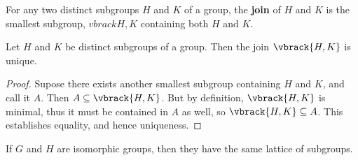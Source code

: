 \begin{definition}
    For any two distinct subgroups $H$ and $K$ of a group, the \textbf{join} of
    $H$ and  $K$ is the smallest subgroup, $vbrack{H,K}$ containing both  $H$
    and  $K$.
\end{definition}

\begin{lemma}\label{2.5.1}
    Let $H$ and  $K$ be distinct subgroups of a group. Then the join
    $\vbrack{H,K}$ is unique.
\end{lemma}
\begin{proof}
    Supose there exists another smallest subgroup containing $H$ and $K$, and
    call it $A$. Then  $A \subseteq \vbrack{H,K}$. But by definition,
    $\vbrack{H,K}$ is minimal, thus it must be contained in $A$ as well, so
    $\vbrack{H,K} \subseteq A$. This establishes equality, and hence uniqueness.
\end{proof}

\begin{lemma}\label{2.5.2}
    If $G$ and  $H$ are isomorphic groups, then they have the same lattice of
    subgroups.
\end{lemma}

